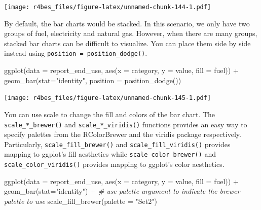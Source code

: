 \documentclass[
]{book}
\newenvironment{Shaded}{\begin{snugshade}}{\end{snugshade}}
\newcommand{\AttributeTok}[1]{\textcolor[rgb]{0.77,0.63,0.00}{#1}}
\newcommand{\CommentTok}[1]{\textcolor[rgb]{0.56,0.35,0.01}{\textit{#1}}}
\newcommand{\FunctionTok}[1]{\textcolor[rgb]{0.00,0.00,0.00}{#1}}
\newcommand{\NormalTok}[1]{#1}
\newcommand{\SpecialCharTok}[1]{\textcolor[rgb]{0.00,0.00,0.00}{#1}}
\newcommand{\StringTok}[1]{\textcolor[rgb]{0.31,0.60,0.02}{#1}}
\begin{document}
\texttt{[image: r4bes\_files/figure-latex/unnamed-chunk-144-1.pdf]}

By default, the bar charts would be stacked. In this scenario, we only have two groups of fuel, electricity and natural gas. However, when there are many groups, stacked bar charts can be difficult to visualize. You can place them side by side instead using \texttt{position\ =\ position\_dodge()}.

\begin{Shaded}
\begin{Highlighting}[]
\FunctionTok{ggplot}\NormalTok{(}\AttributeTok{data =}\NormalTok{ report\_end\_use, }\FunctionTok{aes}\NormalTok{(}\AttributeTok{x =}\NormalTok{ category, }\AttributeTok{y =}\NormalTok{ value, }\AttributeTok{fill =}\NormalTok{ fuel)) }\SpecialCharTok{+}
    \FunctionTok{geom\_bar}\NormalTok{(}\AttributeTok{stat=}\StringTok{"identity"}\NormalTok{, }\AttributeTok{position =} \FunctionTok{position\_dodge}\NormalTok{())}
\end{Highlighting}
\end{Shaded}

\texttt{[image: r4bes\_files/figure-latex/unnamed-chunk-145-1.pdf]}

You can use scale to change the fill and colors of the bar chart. The \texttt{scale\_*\_brewer()} and \texttt{scale\_*\_viridis()} functions provides an easy way to specify palettes from the RColorBrewer and the viridis package respectively. Particularly, \texttt{scale\_fill\_brewer()} and \texttt{scale\_fill\_viridis()} provides mapping to ggplot's fill aesthetics while \texttt{scale\_color\_brewer()} and \texttt{scale\_color\_viridis()} provides mapping to ggplot's color aesthetics.

\begin{Shaded}
\begin{Highlighting}[]
\FunctionTok{ggplot}\NormalTok{(}\AttributeTok{data =}\NormalTok{ report\_end\_use, }\FunctionTok{aes}\NormalTok{(}\AttributeTok{x =}\NormalTok{ category, }\AttributeTok{y =}\NormalTok{ value, }\AttributeTok{fill =}\NormalTok{ fuel)) }\SpecialCharTok{+}
    \FunctionTok{geom\_bar}\NormalTok{(}\AttributeTok{stat=}\StringTok{"identity"}\NormalTok{) }\SpecialCharTok{+} 
    \CommentTok{\# use palette argument to indicate the brewer palette to use}
    \FunctionTok{scale\_fill\_brewer}\NormalTok{(}\AttributeTok{palette =} \StringTok{"Set2"}\NormalTok{) }
\end{Highlighting}
\end{Shaded}
\end{document}
